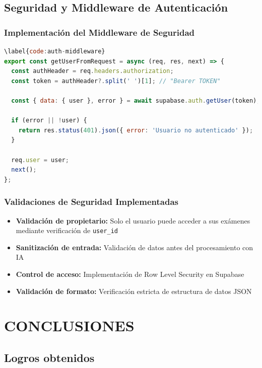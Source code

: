 \documentclass[12pt,a4paper]{report}
\begin{document}
\section{Seguridad y Middleware de Autenticación}

\subsection{Implementación del Middleware de Seguridad}

\begin{lstlisting}[language=JavaScript, caption={Código \ref{code:auth-middleware}: Middleware de seguridad y autenticación}]
\label{code:auth-middleware}
export const getUserFromRequest = async (req, res, next) => {
  const authHeader = req.headers.authorization;
  const token = authHeader?.split(' ')[1]; // "Bearer TOKEN"
  
  const { data: { user }, error } = await supabase.auth.getUser(token);
  
  if (error || !user) {
    return res.status(401).json({ error: 'Usuario no autenticado' });
  }
  
  req.user = user;
  next();
};
\end{lstlisting}

\subsection{Validaciones de Seguridad Implementadas}

\begin{itemize}
\item \textbf{Validación de propietario:} Solo el usuario puede acceder a sus exámenes mediante verificación de \texttt{user\_id}
\item \textbf{Sanitización de entrada:} Validación de datos antes del procesamiento con IA
\item \textbf{Control de acceso:} Implementación de Row Level Security en Supabase
\item \textbf{Validación de formato:} Verificación estricta de estructura de datos JSON
\end{itemize}

\chapter{CONCLUSIONES}

\section{Logros obtenidos}
\end{document}
